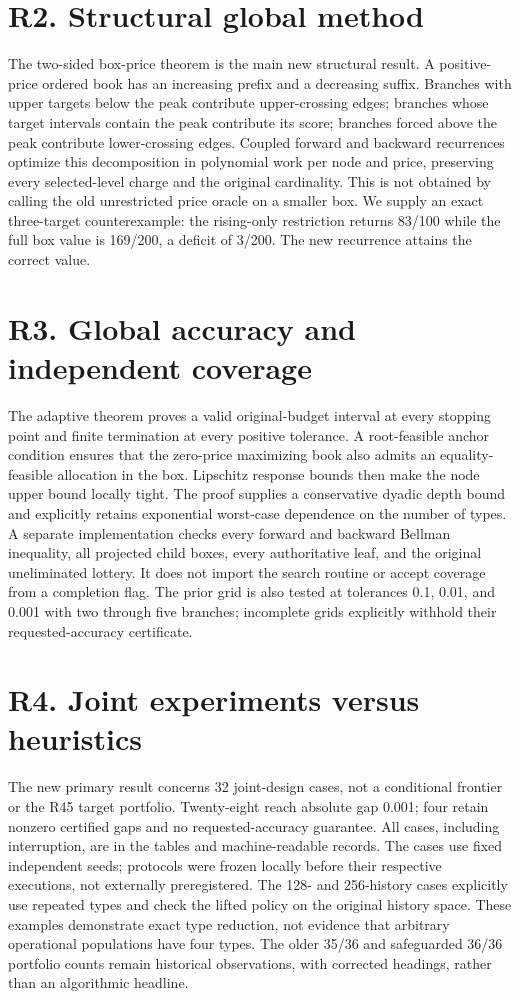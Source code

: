 \documentclass[11pt,letterpaper]{article}
\begin{document}
\section*{R2. Structural global method}
The two-sided box-price theorem is the main new structural result. A positive-price ordered book has an increasing prefix and a decreasing suffix. Branches with upper targets below the peak contribute upper-crossing edges; branches whose target intervals contain the peak contribute its score; branches forced above the peak contribute lower-crossing edges. Coupled forward and backward recurrences optimize this decomposition in polynomial work per node and price, preserving every selected-level charge and the original cardinality. This is not obtained by calling the old unrestricted price oracle on a smaller box. We supply an exact three-target counterexample: the rising-only restriction returns 83/100 while the full box value is 169/200, a deficit of 3/200. The new recurrence attains the correct value.

\section*{R3. Global accuracy and independent coverage}
The adaptive theorem proves a valid original-budget interval at every stopping point and finite termination at every positive tolerance. A root-feasible anchor condition ensures that the zero-price maximizing book also admits an equality-feasible allocation in the box. Lipschitz response bounds then make the node upper bound locally tight. The proof supplies a conservative dyadic depth bound and explicitly retains exponential worst-case dependence on the number of types. A separate implementation checks every forward and backward Bellman inequality, all projected child boxes, every authoritative leaf, and the original uneliminated lottery. It does not import the search routine or accept coverage from a completion flag. The prior grid is also tested at tolerances 0.1, 0.01, and 0.001 with two through five branches; incomplete grids explicitly withhold their requested-accuracy certificate.

\section*{R4. Joint experiments versus heuristics}
The new primary result concerns 32 joint-design cases, not a conditional frontier or the R45 target portfolio. Twenty-eight reach absolute gap 0.001; four retain nonzero certified gaps and no requested-accuracy guarantee. All cases, including interruption, are in the tables and machine-readable records. The cases use fixed independent seeds; protocols were frozen locally before their respective executions, not externally preregistered. The 128- and 256-history cases explicitly use repeated types and check the lifted policy on the original history space. These examples demonstrate exact type reduction, not evidence that arbitrary operational populations have four types. The older 35/36 and safeguarded 36/36 portfolio counts remain historical observations, with corrected headings, rather than an algorithmic headline.
\end{document}
